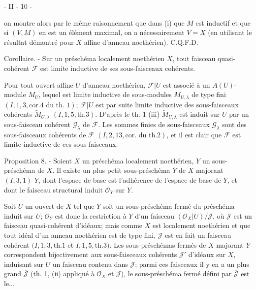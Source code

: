 - II - 10 -

on montre alors par le même raisonnement que dans (i) que $M$ est inductif et que si $(V, M)$ en est un élément maximal, on a nécessairement $V = X$ (en utilisant le résultat démontré pour $X$ affine d'anneau noethérien). C.Q.F.D.

Corollaire. - Sur un préschéma localement noethérien $X$, tout faisceau quasi-cohérent $\mathcal{F}$ est limite inductive de ses sous-faisceaux cohérents.

Pour tout ouvert affine $U$ d'anneau noethérien, $\mathcal{F}|U$ est associé à un $A(U)$-module $M_U$, lequel est limite inductive de sous-modules $M_{U,\lambda}$ de type fini $(I, 1, 3, \text{cor.} 4 \text{ du th. } 1)$; $\mathcal{F}|U$ est par suite limite inductive des sous-faisceaux cohérents $\widetilde{M}_{U,\lambda}$ $(I, 1, 5, \text{th.} 3)$. D'après le th. 1 (iii) $\widetilde{M}_{U,\lambda}$ est induit sur $U$ par un sous-faisceau cohérent $\mathcal{G}_{\lambda}$ de $\mathcal{F}$. Les sommes finies de sous-faisceaux $\mathcal{G}_{\lambda}$ sont des sous-faisceaux cohérents de $\mathcal{F}$ $(I, 2, 13, \text{cor.} \text{ du th.} 2)$, et il est clair que $\mathcal{F}$ est limite inductive de ces sous-faisceaux.

Proposition 8. - Soient $X$ un préschéma localement noethérien, $Y$ un sous-préschéma de $X$. Il existe un plus petit sous-préschéma $\overline{Y}$ de $X$ majorant $(I, 3, 1)$ $Y$, dont l'espace de base est l'adhérence de l'espace de base de $Y$, et dont le faisceau structural induit $\mathcal{O}_Y$ sur $Y$.

Soit $U$ un ouvert de $X$ tel que $Y$ soit un sous-préschéma fermé du préschéma induit sur $U$; $\mathcal{O}_Y$ est donc la restriction à $Y$ d'un faisceau $(\mathcal{O}_X|U)/\mathcal{J}$, où $\mathcal{J}$ est un faisceau quasi-cohérent d'idéaux; mais comme $X$ est localement noethérien et que tout idéal d'un anneau noethérien est de type fini, $\mathcal{J}$ est en fait un faisceau cohérent $(I, 1, 3, \text{th.} 1$ et $I, 1, 5, \text{th.} 3)$. Les sous-préschémas fermés de $X$ majorant $Y$ correspondent bijectivement aux sous-faisceaux cohérents $\mathcal{J}'$ d'idéaux sur $X$, induisant sur $U$ un faisceau contenu dans $\mathcal{J}$; parmi ces faisceaux il y en a un plus grand $\overline{\mathcal{J}}$ (th. 1, (ii) appliqué à $\mathcal{O}_X$ et $\mathcal{J}$), le sous-préschéma fermé défini par $\overline{\mathcal{J}}$ est le...

\newpage


